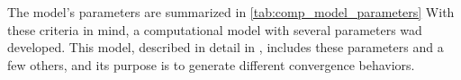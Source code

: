 The model's parameters are summarized in \cref{tab:comp_model_parameters}
With these criteria in mind, a computational model with several parameters wad developed.
This model, described in detail in \citet{Raveh2017Interspeech}, includes these parameters and a few others, and its purpose is to generate different convergence behaviors.

